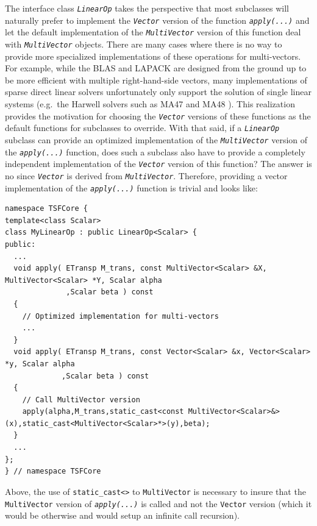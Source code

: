 The interface class {}\texttt{\textit{LinearOp}} takes the perspective
that most subclasses will naturally prefer to implement the
{}\texttt{\textit{Vector}} version of the function
{}\texttt{\textit{apply(\-...)}} and let the default implementation of
the {}\texttt{\textit{Multi\-Vector}} version of this function deal with
{}\texttt{\textit{Multi\-Vector}} objects.  There are many cases where
there is no way to provide more specialized implementations of these
operations for multi-vectors.  For example, while the BLAS and LAPACK
are designed from the ground up to be more efficient with multiple
right-hand-side vectors, many implementations of sparse direct linear
solvers unfortunately only support the solution of single linear
systems (e.g.~the Harwell solvers such as MA47 and MA48
{}\cite{ref:hsl_1995}).  This realization provides the motivation for
choosing the {}\texttt{\textit{Vector}} versions of these functions as
the default functions for subclasses to override.  With that said, if a
{}\texttt{\textit{LinearOp}} subclass can provide an optimized
implementation of the {}\texttt{\textit{Multi\-Vector}} version of the
{}\texttt{\textit{apply(\-...)}} function, does such a subclass also
have to provide a completely independent implementation of the
{}\texttt{\textit{Vector}} version of this function?  The answer is no
since {}\texttt{\textit{Vector}} is derived from
{}\texttt{\textit{Multi\-Vector}}.  Therefore, providing a vector
implementation of the {}\texttt{\textit{apply(\-...)}} function
is trivial and looks like:

{\scriptsize\begin{verbatim}
namespace TSFCore {
template<class Scalar>
class MyLinearOp : public LinearOp<Scalar> {
public:
  ...
  void apply( ETransp M_trans, const MultiVector<Scalar> &X, MultiVector<Scalar> *Y, Scalar alpha
              ,Scalar beta ) const
  {
    // Optimized implementation for multi-vectors
    ...
  }
  void apply( ETransp M_trans, const Vector<Scalar> &x, Vector<Scalar> *y, Scalar alpha
             ,Scalar beta ) const
  {
    // Call MultiVector version
    apply(alpha,M_trans,static_cast<const MultiVector<Scalar>&>(x),static_cast<MultiVector<Scalar>*>(y),beta);
  }
  ...
};
} // namespace TSFCore
\end{verbatim}}

Above, the use of {}\texttt{static\_\-cast<>} to
{}\texttt{Multi\-Vector} is necessary to insure that the
{}\texttt{Multi\-Vector} version of {}\texttt{\textit{apply(\-...)}}
is called and not the {}\texttt{Vector} version (which it would be
otherwise and would setup an infinite call recursion).

